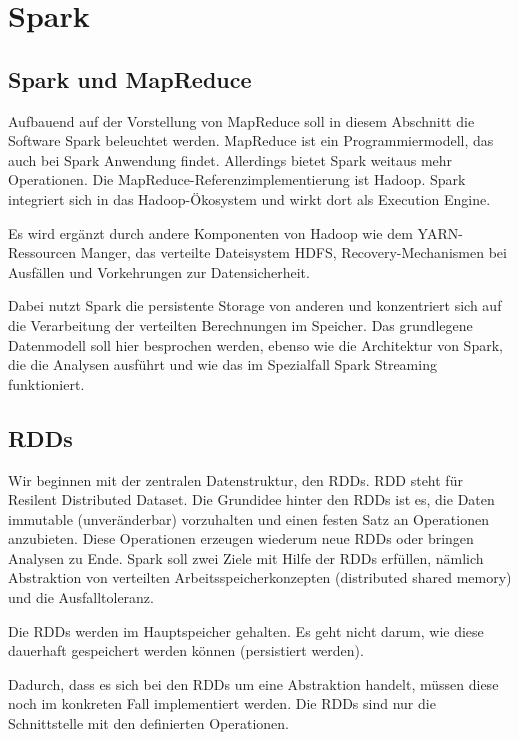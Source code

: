 \chapter{Spark}
\label{Spark}

\section[Spark und MapReduce]{\rmfamily Spark
und MapReduce}
{
Aufbauend auf der Vorstellung von MapReduce soll in diesem Abschnitt die
Software Spark beleuchtet werden. MapReduce ist ein Programmiermodell,
das auch bei Spark Anwendung findet. Allerdings bietet Spark weitaus
mehr Operationen. Die MapReduce-Referenzimplementierung ist Hadoop.
Spark integriert sich in das Hadoop-Ökosystem und wirkt dort als
Execution Engine.}

{
Es wird ergänzt durch andere Komponenten von Hadoop wie dem
YARN-Ressourcen Manger, das verteilte Dateisystem HDFS,
Recovery-Mechanismen bei Ausfällen und Vorkehrungen zur
Datensicherheit.}

{
Dabei nutzt Spark die persistente Storage von anderen und konzentriert
sich auf die Verarbeitung der verteilten Berechnungen im Speicher. Das
grundlegene Datenmodell soll hier besprochen werden, ebenso wie die
Architektur von Spark, die die Analysen ausführt und wie das im Spezialfall
Spark Streaming funktioniert.}

\section[RDDs]{\rmfamily RDDs}
Wir beginnen mit der zentralen Datenstruktur, den RDDs. RDD steht für
Resilent Distributed Dataset. Die Grundidee hinter den RDDs ist es, die
Daten immutable (unveränderbar) vorzuhalten und einen festen Satz an
Operationen anzubieten. Diese Operationen erzeugen wiederum neue RDDs
oder bringen Analysen zu Ende. Spark soll zwei Ziele mit Hilfe der RDDs
erfüllen, nämlich Abstraktion von verteilten Arbeitsspeicherkonzepten
(distributed shared memory) und die Ausfalltoleranz.

Die RDDs werden im Hauptspeicher gehalten. Es geht nicht darum, wie
diese dauerhaft gespeichert werden können (persistiert werden).

Dadurch, dass es sich bei den RDDs um eine Abstraktion handelt, müssen
diese noch im konkreten Fall implementiert werden. Die RDDs sind nur
die Schnittstelle mit den definierten Operationen.

